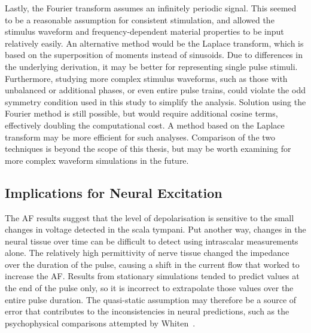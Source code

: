 Lastly, the Fourier transform assumes an infinitely periodic signal. This seemed
to be a reasonable assumption for consistent stimulation, and allowed the
stimulus waveform and frequency-dependent material properties to be input
relatively easily. An alternative method would be the Laplace transform, which
is based on the superposition of moments instead of sinusoids. Due to
differences in the underlying derivation, it may be better for representing
single pulse stimuli. Furthermore, studying more complex stimulus waveforms,
such as those with unbalanced or additional phases, or even entire pulse trains,
could violate the odd symmetry condition used in this study to simplify the
analysis. Solution using the Fourier method is still possible, but would require
additional cosine terms, effectively doubling the computational cost. A method
based on the Laplace transform may be more efficient for such analyses.
Comparison of the two techniques is beyond the scope of this thesis, but may be
worth examining for more complex waveform simulations in the future.

\subsection{Implications for Neural Excitation}

The AF results suggest that the level of depolarisation is sensitive to the
small changes in voltage detected in the scala tympani. Put another way, changes
in the neural tissue over time can be difficult to detect using intrascalar
measurements alone. The relatively high permittivity of nerve tissue changed the
impedance over the duration of the pulse, causing a shift in the current flow
that worked to increase the AF. Results from stationary simulations tended to
predict values at the end of the pulse only, so it is incorrect to extrapolate
those values over the entire pulse duration. The quasi-static assumption may
therefore be a source of error that contributes to the inconsistencies in neural
predictions, such as the psychophysical comparisons attempted by
Whiten~\cite{whiten2007}.

